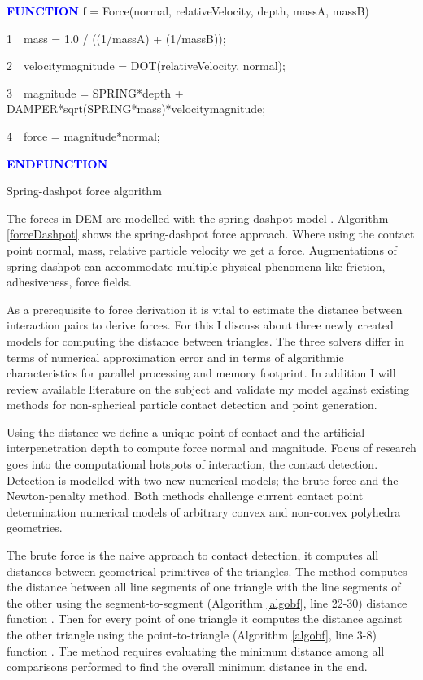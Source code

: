 \documentclass[times,12pt]{article}
\begin{document}
\begin{algorithm}	
  \textbf{\textcolor{blue}{FUNCTION}} f = Force(normal, relativeVelocity, depth, massA, massB)
  
  1~~mass = 1.0 / ((1/massA) + (1/massB));
  
  2~~velocitymagnitude = DOT(relativeVelocity, normal);
  
  3~~magnitude = SPRING*depth + DAMPER*sqrt(SPRING*mass)*velocitymagnitude;
  
  4~~force = magnitude*normal;
  
  \textbf{\textcolor{blue}{ENDFUNCTION}}
\protect\caption{\label{forceDashpot}Spring-dashpot force algorithm}
\end{algorithm}

The forces in DEM are modelled with the spring-dashpot model \cite{Koziara2008, solberg2000, Wachs2012, Williams1999}. Algorithm \ref{forceDashpot} shows the spring-dashpot force approach. Where using the contact point normal, mass, relative particle velocity we get a force. Augmentations of spring-dashpot can accommodate multiple physical phenomena like friction, adhesiveness, force fields. 

As a prerequisite to force derivation it is vital to estimate the distance between interaction pairs\cite{Koziara2008} to derive forces. For this I discuss about three newly created models for computing the distance between triangles. The three solvers differ in terms of numerical approximation error and in terms of algorithmic characteristics for parallel processing and memory footprint. In addition I will review available literature on the subject and validate my model against existing methods for non-spherical particle contact detection and point generation. \cite{Koziara2008}  

Using the distance we define a unique point of contact and the artificial interpenetration depth to compute force normal and magnitude. Focus of research goes into the computational hotspots of interaction, the contact detection. Detection is modelled with two new numerical models; the brute force and the Newton-penalty method. Both methods challenge current contact point determination numerical models of arbitrary convex and non-convex polyhedra geometries\cite{Ericson2005}. 

The brute force is the naive approach to contact detection, it computes all distances between geometrical primitives of the triangles. The method computes the distance between all line segments of one triangle with the line segments of the other using the segment-to-segment (Algorithm \ref{algobf}, line 22-30) distance function \cite{Ericson2005, Tropp2006}. Then for every point of one triangle it computes the distance against the other triangle using the point-to-triangle (Algorithm \ref{algobf}, line 3-8) function \cite{Eberly1999, Ericson2005}. The method requires evaluating the minimum distance among all comparisons performed to find the overall minimum distance in the end.
\end{document}

